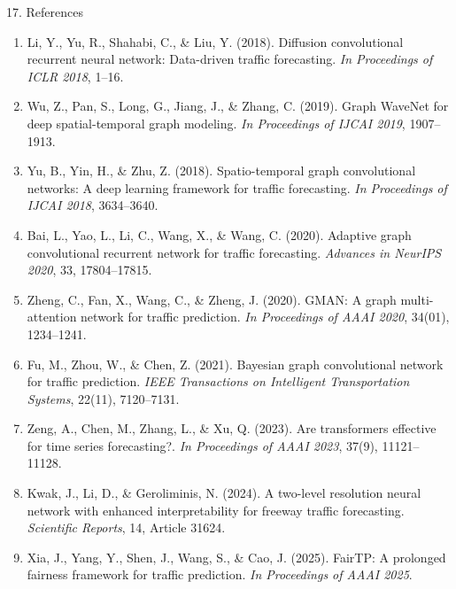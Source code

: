 \documentclass[aspectratio=169, 10pt]{beamer}
\begin{document}
\begin{frame}[allowframebreaks]{17. References}
  \footnotesize
  \begin{enumerate}
    \item Li, Y., Yu, R., Shahabi, C., \& Liu, Y. (2018). Diffusion convolutional recurrent neural network: Data-driven traffic forecasting. \textit{In Proceedings of ICLR 2018}, 1–16.
    
    \item Wu, Z., Pan, S., Long, G., Jiang, J., \& Zhang, C. (2019). Graph WaveNet for deep spatial-temporal graph modeling. \textit{In Proceedings of IJCAI 2019}, 1907–1913.
    
    \item Yu, B., Yin, H., \& Zhu, Z. (2018). Spatio-temporal graph convolutional networks: A deep learning framework for traffic forecasting. \textit{In Proceedings of IJCAI 2018}, 3634–3640.
    
    \item Bai, L., Yao, L., Li, C., Wang, X., \& Wang, C. (2020). Adaptive graph convolutional recurrent network for traffic forecasting. \textit{Advances in NeurIPS 2020}, 33, 17804–17815.
    
    \item Zheng, C., Fan, X., Wang, C., \& Zheng, J. (2020). GMAN: A graph multi-attention network for traffic prediction. \textit{In Proceedings of AAAI 2020}, 34(01), 1234–1241.
    
    \item Fu, M., Zhou, W., \& Chen, Z. (2021). Bayesian graph convolutional network for traffic prediction. \textit{IEEE Transactions on Intelligent Transportation Systems}, 22(11), 7120–7131.
    
    \item Zeng, A., Chen, M., Zhang, L., \& Xu, Q. (2023). Are transformers effective for time series forecasting?. \textit{In Proceedings of AAAI 2023}, 37(9), 11121–11128.
    
    \item Kwak, J., Li, D., \& Geroliminis, N. (2024). A two-level resolution neural network with enhanced interpretability for freeway traffic forecasting. \textit{Scientific Reports}, 14, Article 31624.
    
    \item Xia, J., Yang, Y., Shen, J., Wang, S., \& Cao, J. (2025). FairTP: A prolonged fairness framework for traffic prediction. \textit{In Proceedings of AAAI 2025}.
    

\end{enumerate}
\end{frame}
\end{document}
